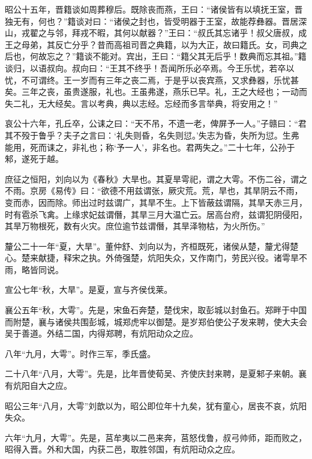 \documentclass[12pt,UTF8]{ctexbook}
\begin{document}
昭公十五年，晋籍谈如周葬穆后。既除丧而燕，王曰：“诸侯皆有以填抚王室，晋独无有，何也？”籍谈对曰：“诸侯之封也，皆受明器于王室，故能荐彝器。晋居深山，戎翟之与邻，拜戎不暇，其何以献器？”王曰：“叔氏其忘诸乎！叔父唐叔，成王之母弟，其反亡分乎？昔而高祖司晋之典籍，以为大正，故曰籍氏。女，司典之后也，何故忘之？”籍谈不能对。宾出，王曰：“籍父其无后乎！数典而忘其祖。”籍谈归，以语叔向。叔向曰：“王其不终乎！吾闻所乐必卒焉。今王乐忧，若卒以忧，不可谓终。王一岁而有三年之丧二焉，于是乎以丧宾燕，又求彝器，乐忧甚矣。三年之丧，虽贵遂服，礼也。王虽弗遂，燕乐已早。礼，王之大经也；一动而失二礼，无大经矣。言以考典，典以志经。忘经而多言举典，将安用之！”



哀公十六年，孔丘卒，公诔之曰：“天不吊，不遗一老，俾屏予一人。”子赣曰：“君其不殁于鲁乎？夫子之言曰：‘礼失则昏，名失则愆。’失志为昏，失所为愆。生弗能用，死而诔之，非礼也；称‘予一人’，非名也。君两失之。”二十七年，公孙于邾，遂死于越。



庶征之恒阳，刘向以为《春秋》大旱也。其夏旱雩祀，谓之大雩。不伤二谷，谓之不雨。京房《易传》曰：“欲德不用兹谓张，厥灾荒。荒，旱也，其旱阴云不雨，变而赤，因而除。师出过时兹谓广，其旱不生。上下皆蔽兹谓隔，其旱天赤三月，时有雹杀飞禽。上缘求妃兹谓僭，其旱三月大温亡云。居高台府，兹谓犯阴侵阳，其旱万物根死，数有火灾。庶位逾节兹谓僭，其旱泽物枯，为火所伤。”



釐公二十一年“夏，大旱”。董仲舒、刘向以为，齐桓既死，诸侯从楚，釐尤得楚心。楚来献捷，释宋之执。外倚强楚，炕阳失众，又作南门，劳民兴役。诸雩旱不雨，略皆同说。



宣公七年“秋，大旱”。是夏，宣与齐侯伐莱。



襄公五年“秋，大雩”。先是，宋鱼石奔楚，楚伐宋，取彭城以封鱼石。郑畔于中国而附楚，襄与诸侯共围彭城，城郑虎牢以御楚。是岁郑伯使公子发来聘，使大夫会吴于善道。外结二国，内得郑聘，有炕阳动众之应。



八年“九月，大雩”。时作三军，季氏盛。



二十八年“八月，大雩”。先是，比年晋使荀吴、齐使庆封来聘，是夏邾子来朝。襄有炕阳自大之应。



昭公三年“八月，大雩”刘歆以为，昭公即位年十九矣，犹有童心，居丧不哀，炕阳失众。



六年“九月，大雩”。先是，莒牟夷以二邑来奔，莒怒伐鲁，叔弓帅师，距而败之，昭得入晋。外和大国，内获二邑，取胜邻国，有炕阳动众之应。
\end{document}
